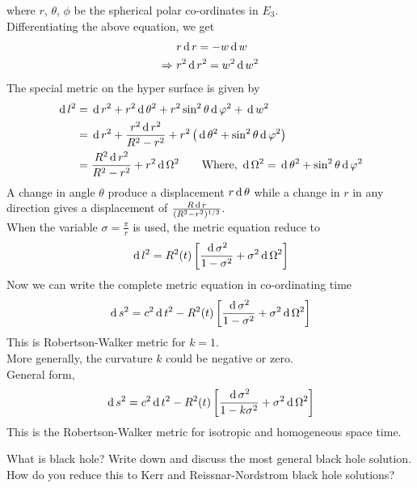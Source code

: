 \documentclass[../main-sheet.tex]{subfiles}
\begin{document}
\begin{soln}
where \(r\), \(\theta\), \(\phi\) be the spherical polar co-ordinates in \(E_3\).\\
Differentiating the above equation, we get
\begin{align}
    &r\,\mathrm{d}\, r=-w\,\mathrm{d}\, w\notag\\
    \Rightarrow\,\,&r^2 \,\mathrm{d}\, r^2=w^2\,\mathrm{d}\, w^2\label{eq:robert2}
\end{align}
The special metric on the hyper surface is given by
\begin{align*}
    \,\mathrm{d}\, l^2&=\,\mathrm{d}\, r^2 + r^2\,\mathrm{d}\, \theta^2 + r^2 \sin^2 \theta \,\mathrm{d}\, \varphi^2 + \,\mathrm{d}\, w^2\\
    &=\,\mathrm{d}\, r^2 + \frac{r^2\,\mathrm{d}\, r^2}{R^2-r^2} + r^2 \left(\,\mathrm{d}\, \theta^2+ \sin^2 \theta \,\mathrm{d}\, \varphi^2\right)\\
    &=\frac{R^2\,\mathrm{d}\, r^2}{R^2-r^2} + r^2 \,\mathrm{d}\,\Omega^2\qquad \text{Where, } \,\mathrm{d}\,\Omega^2=\,\mathrm{d}\,\theta^2+\sin^2\theta\,\mathrm{d}\, \varphi^2
\end{align*} 
A  change  in angle \(\theta\)	produce a displacement \(r\,\mathrm{d}\,\theta\) while a change in \(r\) in any
direction gives a displacement of \(\frac{R\,\mathrm{d}\, r }{(R^2-r^2)^{1/2}}\).\\
When the variable \(\sigma=\frac{\pi}{r }\)
is used, the metric equation reduce to
\[
    \,\mathrm{d}\, l^2=R^2(t)\left[\frac{\,\mathrm{d}\, \sigma^2}{1-\sigma^2} + \sigma^2 \,\mathrm{d}\,\Omega^2\right]
\]
Now we can write the complete metric equation in co-ordinating time
\[
    \,\mathrm{d}\, s^2=c^2\,\mathrm{d}\, t^2-R^2(t)\left[\frac{\,\mathrm{d}\, \sigma^2}{1-\sigma^2} + \sigma^2 \,\mathrm{d}\,\Omega^2\right]
    \]
    This is Robertson-Walker metric for \(k = 1\).\\
    More generally, the curvature \(k\) could be negative or zero.\\
    General form,
    \[
        \,\mathrm{d}\, s^2=c^2\,\mathrm{d}\, t^2-R^2(t)\left[\frac{\,\mathrm{d}\, \sigma^2}{1-k\sigma^2} + \sigma^2 \,\mathrm{d}\,\Omega^2\right]
        \]
        This is the Robertson-Walker metric for isotropic and homogeneous space time.
\end{soln}
\begin{prob}
    What is black hole? Write down and discuss the most general black hole solution. How do you reduce this to Kerr and Reissnar-Nordstrom black hole solutions?
\end{prob}
\end{document}

